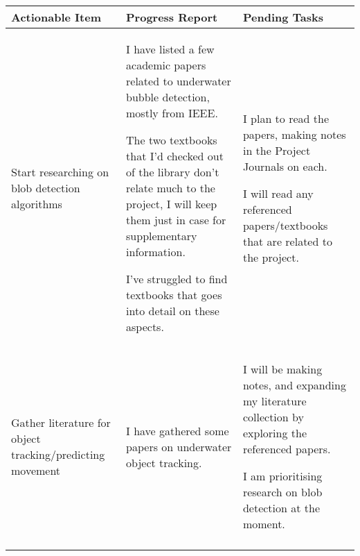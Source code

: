 \begin{table}[!h]
    \centering
    \begin{tabularx}{\textwidth}{|X|X|X|}
        \hline
        Actionable Item & Progress Report & Pending Tasks \\
        \hline
        \hline
        \begin{myitemize}
            \item Start researching on blob detection algorithms
        \end{myitemize} & 
        \begin{myitemize}
            \item I have listed a few academic papers related to underwater bubble detection, mostly from IEEE.
            \item The two textbooks that I'd checked out of the library don't relate much to the project, I will keep them just in case for supplementary information.
            \item I've struggled to find textbooks that goes into detail on these aspects.
        \end{myitemize} & 
        \begin{myitemize}
            \item I plan to read the papers, making notes in the Project Journals on each.
            \item I will read any referenced papers/textbooks that are related to the project.
        \end{myitemize} \\
        \hline
        \begin{myitemize}
            \item Gather literature for object tracking/predicting movement
        \end{myitemize} & 
        \begin{myitemize}
            \item I have gathered some papers on underwater object tracking.
        \end{myitemize} & 
        \begin{myitemize}
            \item I will be making notes, and expanding my literature collection by exploring the referenced papers.
            \item I am prioritising research on blob detection at the moment.
        \end{myitemize} \\
        \hline
        \begin{myitemize}

\end{myitemize}
\end{tabularx}
\end{table}
